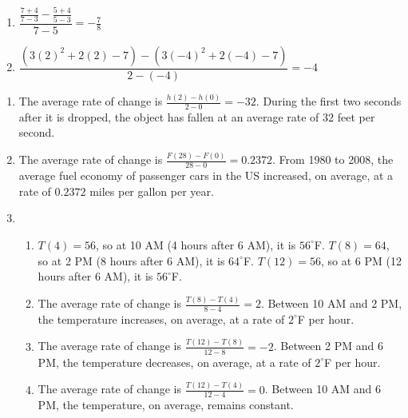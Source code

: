 \begin{multicols}{2}
\begin{enumerate}
\setcounter{enumi}{\value{HW}}


\item $\dfrac{\frac{7 + 4}{7 - 3} - \frac{5 + 4}{5 - 3}}{7 - 5} = -\frac{7}{8}$ 
\item \scriptsize $\dfrac{(3(2)^{2}+2(2)-7)-(3(-4)^{2}+2(-4)-7)}{2-(-4)}=-4$ \normalsize



\setcounter{HW}{\value{enumi}}
\end{enumerate}
\end{multicols}


\begin{enumerate}
\setcounter{enumi}{\value{HW}}


\item The average rate of change is $\frac{h(2) - h(0)}{2-0}=-32$.  During the first two seconds after it is dropped, the object has fallen at an average rate of $32$ feet per second.  

\item The average rate of change is $\frac{F(28) - F(0)}{28-0}=0.2372$.  From 1980 to 2008, the average fuel economy of passenger cars in the US increased, on average, at a rate of $0.2372$ miles per gallon per year.

\item 
\begin{enumerate}

\item  $T(4) = 56$, so at 10 AM (4 hours after 6 AM), it is $56^{\circ}$F.  $T(8) = 64$, so at 2 PM (8 hours after 6 AM), it is $64^{\circ}$F.  $T(12) = 56$, so at 6 PM (12 hours after 6 AM), it is $56^{\circ}$F.

\item  The average rate of change is $\frac{T(8)-T(4)}{8-4}=2$.  Between 10 AM and 2 PM, the temperature increases, on average, at a rate of $2^{\circ}$F per hour.

\item  The average rate of change is $\frac{T(12)-T(8)}{12-8}=-2$.  Between 2 PM and 6 PM, the temperature decreases, on average, at a rate of $2^{\circ}$F per hour.

\item  The average rate of change is $\frac{T(12)-T(4)}{12-4}=0$.  Between 10 AM and 6 PM, the temperature, on average, remains constant.

\end{enumerate}



\end{enumerate}

